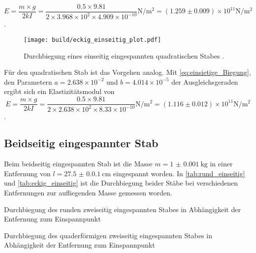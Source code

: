 \begin{equation*}
  E=\frac{m \times g}{2kI} = \frac{0.5 \times 9.81}{2 \times 3.968 \times 10^{2} \times 4.909 \times 10^{-10}} \unit{\newton\per\meter\squared} = (1.259 \pm 0.009) \times 10^{11} \unit{\newton\per\meter\squared}
\end{equation*}.


\begin{figure}[H]
  \centering
  \texttt{[image: build/eckig\_einseitig\_plot.pdf]}
  \caption{Durchbiegung eines einseitig eingespannten quadratischen Stabes \cite{V103}.}
  \label{fig:Stab_eckig}
\end{figure}

\noindent Für den quadratischen Stab ist das Vorgehen analog. Mit \autoref{eq:einsietige_Biegung}, den Parametern $a=2.638 \times 10^{-2}$ und $b=4.014 \times 10^{-5}$ der Ausgleichsgeraden ergibt sich ein Elastizitätsmodul von
\begin{equation*}
  E=\frac{m \times g}{2kI} = \frac{0.5 \times 9.81}{2 \times 2.638 \times 10^{2} \times 8.33 \times 10^{-10}} \unit{\newton\per\meter\squared} = (1.116 \pm 0.012) \times 10^{11} \unit{\newton\per\meter\squared}
\end{equation*}.

\subsection{Beidseitig eingespannter Stab}

Beim beidseitig eingespannten Stab ist die Masse $m=\qty{1(0.001)}{\kilo\gram}$ in einer Entfernung von $l=\qty{27.5(0.01)}{\centi\meter}$
eingespannt worden. In \autoref{tab:rund_einseitig} und \autoref{tab:eckig_einseitig} ist die Durchbiegung beider Stäbe bei verschiedenen Entfernungen zur
aufliegenden Masse gemessen worden.

\begin{table}[H]
  \centering
  \begin{minipage}[b]{0.5\textwidth}
    \centering
    
    \caption{Durchbiegung des runden zweiseitig eingespannten Stabes in Abhängigkeit der Entfernung zum Einspannpunkt}
    \label{tab:rund_einseitig}
  \end{minipage}
  \hfill
  \begin{minipage}[b]{0.5\textwidth}
    \centering
    
    \caption{Durchbiegung des quaderförmigen zweiseitig eingespannten Stabes in Abhängigkeit der Entfernung zum Einspannpunkt}
    \label{tab:eckig_einseitig}
  \end{minipage}
\end{table}

